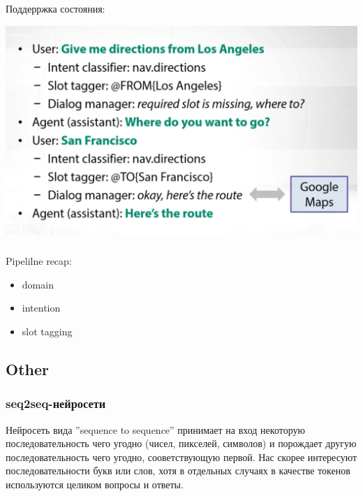 \documentclass[t, 11pt]{beamer}
\begin{document}
\begin{frame}
	\frametitle{\insertsection}
	\frametitle{\insertsubsection}
	Поддерржка состояния:
	
	\includegraphics[width=0.9\linewidth]{ex0.png}
	
	
	

\end{frame}




\begin{frame}
	\frametitle{\insertsection}
	\frametitle{\insertsubsection}
	Pipelilne recap:
	\begin{itemize}
		\item domain
		\item intention 
		\item slot tagging 
	\end{itemize}
	
\end{frame}


\subsection{Other} \label{l3}


\begin{frame}
	\frametitle{\insertsection}
	\frametitle{seq2seq-нейросети}
   
   
   
Нейросеть вида ”sequence to sequence” принимает на вход
некоторую последовательность чего угодно (чисел, пикселей,
символов) и порождает другую последовательность чего угодно,
сооветствующую первой. Нас скорее интересуют
последовательности букв или слов, хотя в отдельных случаях в
качестве токенов используются целиком вопросы и ответы.
	
\end{frame}
\end{document}
